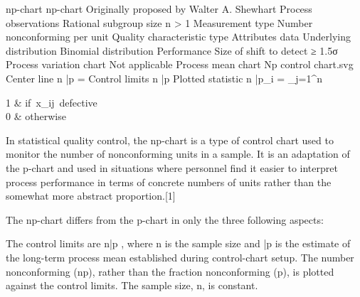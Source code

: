 np-chart
np-chart
Originally proposed by	Walter A. Shewhart
Process observations
Rational subgroup size	n > 1
Measurement type	Number nonconforming per unit
Quality characteristic type	Attributes data
Underlying distribution	Binomial distribution
Performance
Size of shift to detect	≥ 1.5σ
Process variation chart
Not applicable
Process mean chart
Np control chart.svg
Center line	n \bar p = 
Control limits	n \bar p 
Plotted statistic	n \bar p_i = \sum_{j=1}^n \begin{cases} 1 & \mbox{if }x_{ij}\mbox{ defective} \\ 0 & \mbox{otherwise} \end{cases}
In statistical quality control, the np-chart is a type of control chart used to monitor the number of nonconforming units in a sample. It is an adaptation of the p-chart and used in situations where personnel find it easier to interpret process performance in terms of concrete numbers of units rather than the somewhat more abstract proportion.[1]

The np-chart differs from the p-chart in only the three following aspects:

The control limits are n\bar p , where n is the sample size and \bar p is the estimate of the long-term process mean established during control-chart setup.
The number nonconforming (np), rather than the fraction nonconforming (p), is plotted against the control limits.
The sample size, n, is constant.

